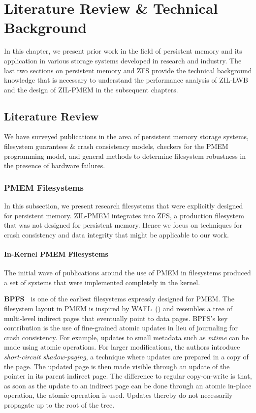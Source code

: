 \documentclass[12pt,a4paper,twoside]{book}
\begin{document}
\chapter{Literature Review \& Technical Background}\label{ch:litreviewandbackground}
In this chapter, we present prior work in the field of persistent memory and its application in various storage systems developed in research and industry.
The last two sections on persistent memory and ZFS provide the technical background knowledge that is necessary to understand the performance analysis of ZIL-LWB and the design of ZIL-PMEM in the subsequent chapters.

\section{Literature Review}
We have surveyed publications in the area of persistent memory storage systems, filesystem guarantees \& crash consistency models, checkers for the PMEM programming model, and general methods to determine filesystem robustness in the presence of hardware failures.

\subsection{PMEM Filesystems}
In this subsection, we present research filesystems that were explicitly designed for persistent memory.
ZIL-PMEM integrates into ZFS, a production filesystem that was not designed for persistent memory.
Hence we focus on techniques for crash consistency and data integrity that might be applicable to our work.

\subsubsection{In-Kernel PMEM Filesystems}\label{sec:in_kernel_pmem_filesystems}
The initial wave of publications around the use of PMEM in filesystems produced a set of systems that were implemented completely in the kernel.

\newcommand{\citerelwork}[2]{\textbf{#1~\cite{#2}}}

\citerelwork{BPFS}{conditBetterByteaddressablePersistent2009} is one of the earliest filesystems expressly designed for PMEM.
The filesystem layout in PMEM is inspired by WAFL~(\cite{hitzFileSystemDesign1994}) and resembles a tree of multi-level indirect pages that eventually point to data pages.
BPFS’s key contribution is the use of fine-grained atomic updates in lieu of journaling for crash consistency.
For example, updates to small metadata such as \textit{mtime} can be made using atomic operations.
For larger modifications, the authors introduce \textit{short-circuit shadow-paging}, a technique where updates are prepared in a copy of the page.
The updated page is then made visible through an update of the pointer in its parent indirect page.
The difference to regular copy-on-write is that, as soon as the update to an indirect page can be done through an atomic in-place operation, the atomic operation is used.
Updates thereby do not necessarily propagate up to the root of the tree.
\end{document}
